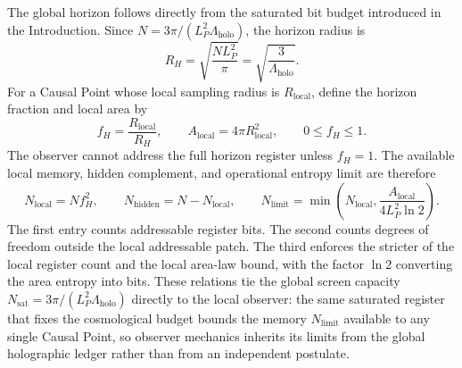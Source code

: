 \documentclass[11pt,letterpaper]{article}
\theoremstyle{plain}
\newcommand{\Lholo}{\Lambda_{\text{holo}}}
\newcommand{\Nsat}{N_{\text{sat}}}
\newcommand{\Nbits}{N}
\newcommand{\Lp}{L_P}
\begin{document}
The global horizon follows directly from the saturated bit budget introduced in
the Introduction.  Since $\Nbits=3\pi/(\Lp^2\Lholo)$, the horizon radius is
\begin{equation}
\label{eq:section-seven-global-horizon}
 \boxed{
 R_H
 =
 \sqrt{\frac{\Nbits\Lp^2}{\pi}}
 =
 \sqrt{\frac{3}{\Lholo}}.
 }
\end{equation}
For a Causal Point whose local sampling radius is $R_{\text{local}}$, define the
horizon fraction and local area by
\begin{equation}
\label{eq:section-seven-local-horizon-fraction}
 f_H
 =
 \frac{R_{\text{local}}}{R_H},
 \qquad
 A_{\text{local}}=4\pi R_{\text{local}}^2,
 \qquad
 0\le f_H\le1.
\end{equation}
The observer cannot address the full horizon register unless $f_H=1$.  The
available local memory, hidden complement, and operational entropy limit are
therefore
\begin{equation}
\label{eq:section-seven-local-memory-budget}
 \boxed{
 N_{\text{local}}
 =
 \Nbits f_H^2,
 \qquad
 N_{\text{hidden}}
 =
 \Nbits-N_{\text{local}},
 \qquad
 N_{\text{limit}}
 =
 \min\!\left(
 N_{\text{local}},
 \frac{A_{\text{local}}}{4\Lp^2\ln2}
 \right).
 }
\end{equation}
The first entry counts addressable register bits.  The second counts degrees of
freedom outside the local addressable patch.  The third enforces the stricter
of the local register count and the local area-law bound, with the factor
$\ln2$ converting the area entropy into bits.  These relations tie the global
screen capacity \(\Nsat=3\pi/(\Lp^2\Lholo)\) directly to the local observer:
the same saturated register that fixes the cosmological budget bounds the
memory \(N_{\text{limit}}\) available to any single Causal Point, so observer
mechanics inherits its limits from the global holographic ledger rather than
from an independent postulate.
\end{document}
